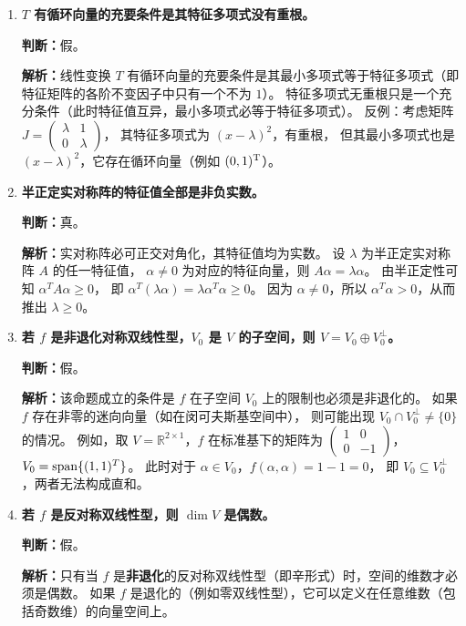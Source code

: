 \bigskip
\begin{enumerate}
\item \textbf{$T$ 有循环向量的充要条件是其特征多项式没有重根。}

\textbf{判断：}假。

\textbf{解析：}线性变换 $T$ 有循环向量的充要条件是其最小多项式等于特征多项式（即特征矩阵的各阶不变因子中只有一个不为 $1$）。
特征多项式无重根只是一个充分条件（此时特征值互异，最小多项式必等于特征多项式）。
反例：考虑矩阵 $J=\begin{pmatrix}\lambda&1\\0&\lambda\end{pmatrix}$，
其特征多项式为 $(x-\lambda)^2$，有重根，
但其最小多项式也是 $(x-\lambda)^2$，它存在循环向量（例如 $(0,1)^{\rm T}$）。

\item \textbf{半正定实对称阵的特征值全部是非负实数。}

\textbf{判断：}真。

\textbf{解析：}实对称阵必可正交对角化，其特征值均为实数。
设 $\lambda$ 为半正定实对称阵 $A$ 的任一特征值，
$\alpha\neq0$ 为对应的特征向量，则 $A\alpha=\lambda\alpha$。
由半正定性可知 $\alpha^TA\alpha\ge0$，
即 $\alpha^T(\lambda\alpha)=\lambda\alpha^T\alpha\ge0$。
因为 $\alpha\neq0$，所以 $\alpha^T\alpha>0$，从而推出 $\lambda\ge0$。

\item \textbf{若 $f$ 是非退化对称双线性型，$V_0$ 是 $V$ 的子空间，则 $V=V_0\oplus V_0^\perp$。}

\textbf{判断：}假。

\textbf{解析：}该命题成立的条件是 $f$ 在子空间 $V_0$ 上的限制也必须是非退化的。
如果 $f$ 存在非零的迷向向量（如在闵可夫斯基空间中），
则可能出现 $V_0\cap V_0^\perp\neq\{0\}$ 的情况。
例如，取 $V=\mathbb{R}^{2\times1}$，$f$ 在标准基下的矩阵为 
$\begin{pmatrix}1&0\\0&-1\end{pmatrix}$，$V_0=\operatorname{span}\{(1,1)^T\}$。
此时对于 $\alpha\in V_0$，$f(\alpha,\alpha)=1-1=0$，
即 $V_0\subseteq V_0^\perp$，两者无法构成直和。

\item \textbf{若 $f$ 是反对称双线性型，则 $\dim V$ 是偶数。}

\textbf{判断：}假。

\textbf{解析：}只有当 $f$ 是\textbf{非退化}的反对称双线性型（即辛形式）时，空间的维数才必须是偶数。
如果 $f$ 是退化的（例如零双线性型），它可以定义在任意维数（包括奇数维）的向量空间上。


\end{enumerate}
